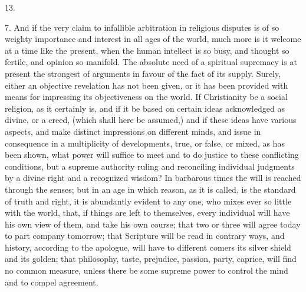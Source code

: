 13.

7. And if the very claim to infallible arbitration in
religious disputes is of so weighty importance and
interest in all ages of the world, much more is it
welcome at a time like the present, when the human
intellect is so busy, and thought so fertile, and opinion
so manifold. The absolute need of a spiritual supremacy
is at present the strongest of arguments in favour of the
fact of its supply. Surely, either an objective
revelation has not been given, or it has been provided
with means for impressing its objectiveness on the world.
If Christianity be a social religion, as it certainly is,
and if it be based on certain ideas acknowledged as
divine, or a creed, (which shall here be assumed,) and if
these ideas have various aspects, and make distinct
impressions on different minds, and issue in consequence
in a multiplicity of developments, true, or false, or
mixed, as has been shown, what power will suffice to meet
and to do justice to these conflicting conditions, but a
supreme authority ruling and reconciling individual
judgments by a divine right and a recognized wisdom? In
barbarous times the will is reached through the senses;
but in an age in which reason, as it is called, is the
standard of truth and right, it is abundantly evident to
any one, who mixes ever so little with the world, that,
if things are left to themselves, every individual will
have his own view of them, and take his own course; that
two or three will agree today to part company tomorrow;
that Scripture will be read in contrary ways, and
history, according to the apologue, will have to
different comers its silver shield and its golden; that
philosophy, taste, prejudice, passion, party, caprice,
will find no common measure, unless there be some supreme
power to control the mind and to compel agreement.

